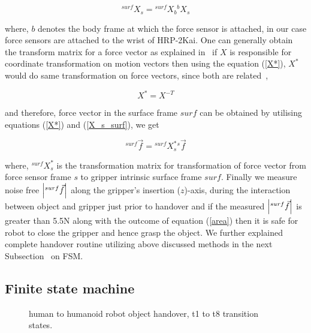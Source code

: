 \begin{equation}\label{X_s_surf}
    {}^{surf}X_{s} = {}^{surf}X_{b} {}^{b}X_s
\end{equation}

where, $b$ denotes the body frame at which the force sensor is attached, in our case force sensors are attached to the wrist of HRP-2Kai. One can generally obtain the transform matrix for a force vector as explained in~\cite{featherstone2014rigid} if $X$ is responsible for coordinate transformation on motion vectors then using the equation (\ref{X*}), $X^{*}$ would do same transformation on force vectors, since both are related~\cite{featherstone2014rigid},

\begin{equation}\label{X*}
    X^{*} = X^{-T}
\end{equation}

and therefore, force vector in the surface frame $surf$ can be obtained by utilising equations (\ref{X*}) and (\ref{X_s_surf}), we get

\begin{equation}\label{force surf}
    {}^{surf}\vec{f} = {}^{surf}X_{s}^{*} {}^s\vec{f}
\end{equation}

where, ${}^{surf}X_{s}^{*}$ is the transformation matrix for transformation of force vector from force sensor frame $s$ to gripper intrinsic surface frame $surf$. Finally we measure noise free $\abs{{}^{surf}\vec{f}}$ along the gripper's insertion ($z$)-axis, during the interaction between object and gripper just prior to handover and if the measured $\abs{{}^{surf}\vec{f}}$ is greater than 5.5N along with the outcome of equation (\ref{area}) then it is safe for robot to close the gripper and hence grasp the object. We further explained complete handover routine utilizing above discussed methods in the next Subsection~ on FSM.

\subsection{Finite state machine}\label{FSM}

\begin{figure}[hpt]
	\caption{human to humanoid robot object handover, t1 to t8 transition states.}
	\label{fig:h-to-r}
\end{figure}

